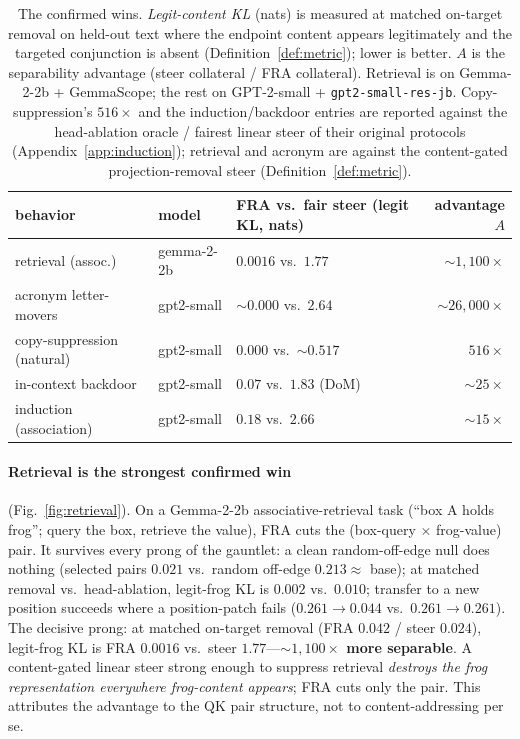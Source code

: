 \documentclass[11pt]{article}
\theoremstyle{definition}
\theoremstyle{plain}
\theoremstyle{remark}
\begin{document}
\begin{table}[t]
\centering
\caption{The confirmed wins. \emph{Legit-content KL} (nats) is measured at matched on-target removal on held-out text where the endpoint content appears legitimately and the targeted conjunction is absent (Definition~\ref{def:metric}); lower is better. $A$ is the separability advantage (steer collateral / FRA collateral). Retrieval is on Gemma-2-2b + GemmaScope; the rest on GPT-2-small + \texttt{gpt2-small-res-jb}. Copy-suppression's $516\times$ and the induction/backdoor entries are reported against the head-ablation oracle / fairest linear steer of their original protocols (Appendix~\ref{app:induction}); retrieval and acronym are against the content-gated projection-removal steer (Definition~\ref{def:metric}).}
\label{tab:wins}
\begin{tabular}{lllr}
\toprule
behavior & model & FRA vs.\ fair steer (legit KL, nats) & advantage $A$ \\
\midrule
retrieval (assoc.)      & gemma-2-2b & $0.0016$ vs.\ $1.77$  & ${\sim}1{,}100\times$ \\
acronym letter-movers   & gpt2-small & ${\sim}0.000$ vs.\ $2.64$ & ${\sim}26{,}000\times$ \\
copy-suppression (natural) & gpt2-small & $0.000$ vs.\ ${\sim}0.517$ & $516\times$ \\
in-context backdoor     & gpt2-small & $0.07$ vs.\ $1.83$ (DoM) & ${\sim}25\times$ \\
induction (association)  & gpt2-small & $0.18$ vs.\ $2.66$ & ${\sim}15\times$ \\
\bottomrule
\end{tabular}
\end{table}

\paragraph{Retrieval is the strongest confirmed win} (Fig.~\ref{fig:retrieval}). On a Gemma-2-2b associative-retrieval task (``box A holds frog''; query the box, retrieve the value), FRA cuts the (box-query $\times$ frog-value) pair. It survives every prong of the gauntlet: a clean random-off-edge null does nothing (selected pairs $0.021$ vs.\ random off-edge $0.213\approx$ base); at matched removal vs.\ head-ablation, legit-frog KL is $0.002$ vs.\ $0.010$; transfer to a new position succeeds where a position-patch fails ($0.261{\to}0.044$ vs.\ $0.261{\to}0.261$). The decisive prong: at matched on-target removal (FRA $0.042$ / steer $0.024$), legit-frog KL is FRA $0.0016$ vs.\ steer $1.77$---\textbf{${\sim}1{,}100\times$ more separable}. A content-gated linear steer strong enough to suppress retrieval \emph{destroys the frog representation everywhere frog-content appears}; FRA cuts only the pair. This attributes the advantage to the QK pair structure, not to content-addressing per se.
\end{document}
